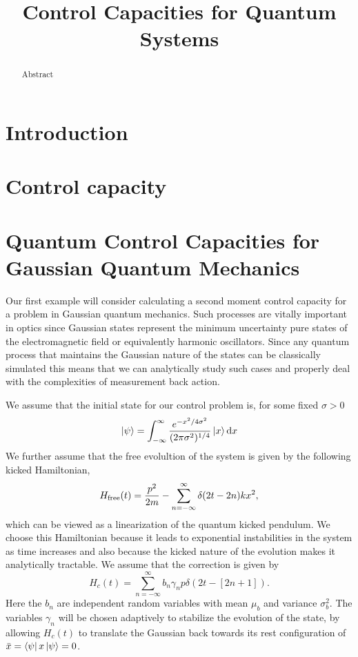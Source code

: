 \documentclass[superscriptaddress,aps,pra,nofootinbib,onecolumn,notitlepage,10pt]{revtex4-1}
\def\bra#1{\mathinner{\langle{#1}|}}
\def\ket#1{\mathinner{|{#1}\rangle}}
\begin{document}
\title{Control Capacities for Quantum Systems}
\begin{abstract}
Abstract
\end{abstract}
\maketitle
\section{Introduction}
\section{Control capacity}

\section{Quantum Control Capacities for Gaussian Quantum Mechanics}
Our first example will consider calculating a second moment control capacity for a problem in Gaussian quantum mechanics.
Such processes are vitally important in optics since Gaussian states represent the minimum uncertainty pure states
of the electromagnetic field or equivalently harmonic oscillators.  Since any quantum process that maintains the Gaussian
nature of the states can be classically simulated this means that we can analytically study such cases and properly deal
with the complexities of measurement back action.

We assume that the initial state for our control problem is, for some fixed $\sigma>0$
\begin{equation}
\ket{\psi} = \int_{-\infty}^\infty \frac{e^{-x^2/4\sigma^2}}{(2\pi \sigma^2)^{1/4}}\ket{x}\mathrm{d}x\label{eq:psi0}
\end{equation}
We further assume that the free evolultion of the system is given by the following kicked Hamiltonian,
\begin{equation}
H_{\rm free}(t) = \frac{p^2}{2m} - \sum_{n=-\infty}^\infty \delta(2t-2n) k x^2,
\end{equation}
which can be viewed as a linearization of the quantum kicked pendulum.  We choose this Hamiltonian because it leads to exponential instabilities
in the system as time increases and also because the kicked nature of the evolution makes it analytically tractable.
We assume that the correction is given by
\begin{equation}
H_{c}(t) = \sum_{n=-\infty}^\infty b_n \gamma_n p\delta(2t-[2n+1]).
\end{equation}
Here the $b_n$ are independent random variables with mean $\mu_b$ and variance $\sigma_b^2$.  The variables $\gamma_n$ will be chosen adaptively to stabilize the evolution of the state, by allowing $H_c(t)$ to translate the Gaussian back towards its rest configuration of $\bar{x} = \bra{\psi} x \ket{\psi}=0$.
\end{document}

